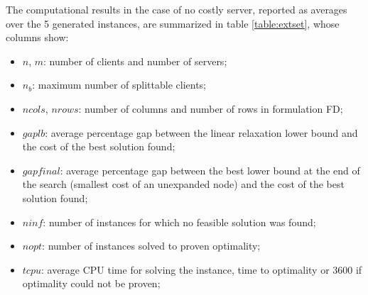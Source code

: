 \documentclass[ijoc,sglanonrev]{informs4}
\begin{document}
The computational results in the case of no costly server, reported as averages over the 5 generated instances, are summarized in table \ref{table:extset}, whose columns show:
\begin{itemize}
    \item $n$, $m$: number of clients and number of servers;
    \item $n_b$: maximum number of splittable clients;
    \item $ncols$, $nrows$: number of columns and number of rows in formulation FD;
    \item $gaplb$: average percentage gap between the linear relaxation lower bound and the cost of the best solution found;
    \item $gapfinal$: average percentage gap between the best lower bound at the end of the search (smallest cost of an unexpanded node) and the cost of the best solution found;
    \item $ninf$: number of instances for which no feasible solution was found;
    \item $nopt$: number of instances solved to proven optimality;
    \item $tcpu$: average CPU time for solving the instance, time to optimality or 3600 if optimality could not be proven;
\end{itemize}
\end{document}
